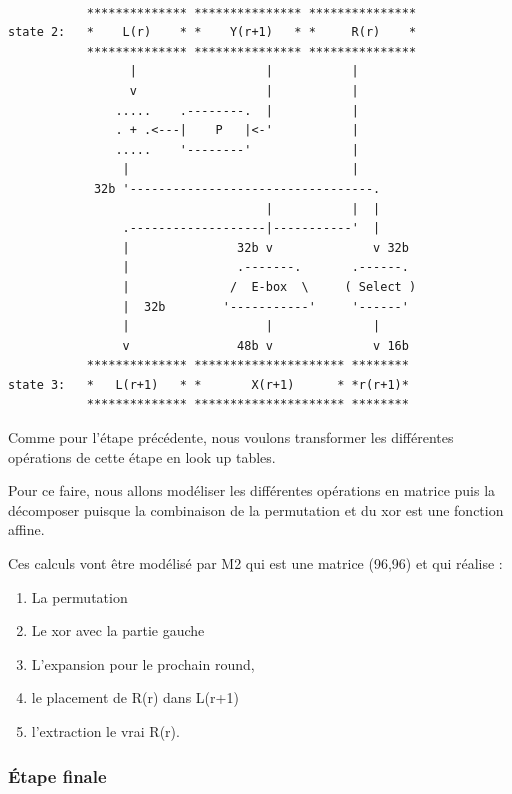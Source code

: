 \documentclass[a4paper,12pt]{article}
\begin{document}
\begin{Verbatim}[samepage=true]

           ************** *************** ***************
state 2:   *    L(r)    * *    Y(r+1)   * *     R(r)    *
           ************** *************** ***************
                 |                  |           |
                 v                  |           |
               .....    .--------.  |           |
               . + .<---|    P   |<-'           |
               .....    '--------'              |
                |                               |
            32b '----------------------------------.
                                    |           |  |
                .-------------------|-----------'  |
                |               32b v              v 32b
                |               .-------.       .------.
                |              /  E-box  \     ( Select )
                |  32b        '-----------'     '------'
                |                   |              |
                v               48b v              v 16b
           ************** ********************* ********
state 3:   *   L(r+1)   * *       X(r+1)      * *r(r+1)*
           ************** ********************* ********

\end{Verbatim}


Comme pour l'étape précédente, nous voulons transformer les différentes opérations de cette étape en look up tables.

Pour ce faire, nous allons modéliser les différentes opérations en matrice puis la décomposer puisque la combinaison de la permutation et du xor est une fonction affine.

Ces calculs vont être modélisé par M2 qui est une matrice (96,96) et qui réalise :
\begin{enumerate}
\item La permutation
\item Le xor avec la partie gauche
\item L'expansion pour le prochain round,
\item le placement de R(r) dans L(r+1) 
\item l'extraction le vrai R(r).
\end{enumerate}



\subsubsection{Étape finale}
\end{document}
